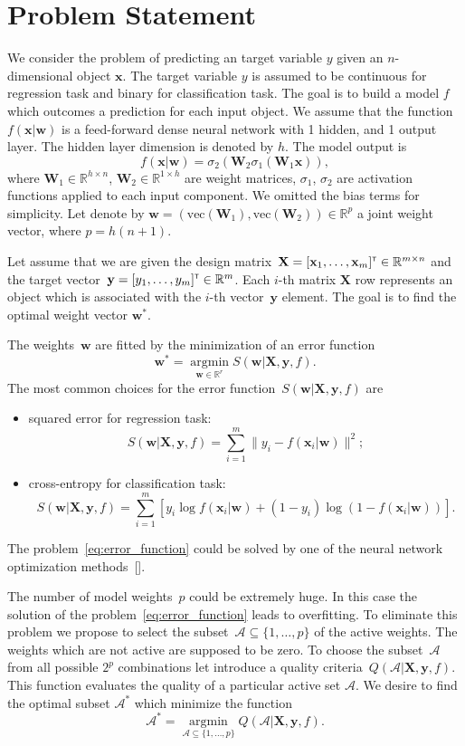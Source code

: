 \documentclass[a4paper,12pt]{article}
\theoremstyle{plain} %
\theoremstyle{definition} %
\theoremstyle{remark} %
\newcommand{\bw}{\mathbf{w}}
\newcommand{\bW}{\mathbf{W}}
\newcommand{\by}{\mathbf{y}}
\newcommand{\bx}{\mathbf{x}}
\newcommand{\bX}{\mathbf{X}}
\newcommand{\cA}{\mathcal{A}}
\newcommand{\bbR}{\mathbb{R}}
\newcommand{\T}{{\text{\tiny\sffamily\upshape\mdseries T}}}
\newcommand{\argmin}{\mathop{\arg \min}\limits}
\begin{document}
		
	\section*{Problem Statement}
	We consider the problem of predicting an target variable $y$ given an $n$-dimensional object $\bx$. 
	The target variable $y$ is assumed to be continuous for regression task and binary for classification task.
	The goal is to build a model $f$ which outcomes a prediction for each input object.
	We assume that the function~$f (\bx | \bw)$ is a feed-forward dense neural network with 1 hidden, and 1 output layer. The hidden layer dimension is denoted by $h$. The model output is
	\[
	f(\bx | \bw) = \sigma_2\left(\bW_2 \sigma_1(\bW_1 \bx)\right),
	\]
	where $\bW_1 \in \bbR^{h \times n}$, $\bW_2 \in \bbR^{1 \times h}$ are weight matrices, $\sigma_1$, $\sigma_2$ are activation functions applied to each input component. We omitted the bias terms for simplicity.
	Let denote by $\bw = (\text{vec}(\bW_1), \text{vec}(\bW_2)) \in \bbR^p$ a joint weight vector, where $p=h(n + 1)$.
	
	Let assume that we are given the design matrix~$\bX = [\bx_1, \dots, \bx_m]^{\T} \in \bbR^{m \times n}$ and the target vector~$\by = [y_1, \dots, y_m]^{\T} \in \bbR^{m}$. 
	Each $i$-th matrix $\bX$ row represents an object which is associated with the $i$-th vector~$\by$ element.
	The goal is to find the optimal weight vector $\bw^*$.
	
	The weights~$\bw$ are fitted by the minimization of an error function
	\begin{equation}
	\bw^* = \argmin_{\bw \in \bbR^r} S(\bw | \bX, \by, f).
	\label{eq:error_function}
	\end{equation}
	The most common choices for the error function~$S(\bw | \bX, \by, f)$ are
	\begin{itemize}
		\item squared error for regression task: 
		$$
			S(\bw | \bX, \by, f) = \sum_{i=1}^m \| y_i - f(\bx_i | \bw)\|^2;
		$$
		\item cross-entropy for classification task: 
		$$
			S(\bw | \bX, \by, f) = \sum_{i=1}^m \left[y_i \log f (\bx_i | \bw) + (1-y_i) \log (1 - f (\bx_i | \bw))\right].
		$$
	\end{itemize}
	The problem~\ref{eq:error_function} could be solved by one of the neural network optimization methods~[].
	
	The number of model weights~$p$ could be extremely huge. 
	In this case the solution of the problem~\ref{eq:error_function} leads to overfitting. 
	To eliminate this problem we propose to select the subset~$\cA \subseteq \{1, \dots, p\}$ of the active weights. 
	The weights which are not active are supposed to be zero.
	To choose the subset~$\cA$ from all possible $2^p$ combinations let introduce a quality criteria~$Q(\cA | \bX, \by, f)$. 
	This function evaluates the quality of a particular active set $\cA$. 
	We desire to find the optimal subset $\cA^*$ which minimize the function
	\begin{equation}
		\cA^* = \argmin_{\cA \subseteq \{1, \dots, p\}} Q(\cA | \bX, \by, f).
		\label{eq:quality_criteria}
	\end{equation}
	
\end{document}
